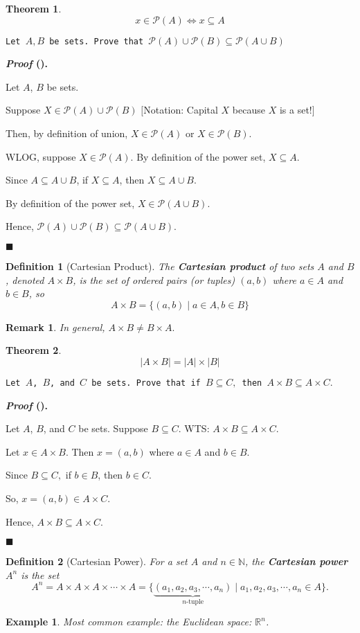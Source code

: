 \documentclass[12pt,a4paper]{article}
\newtheorem{thm}{Theorem}[subsection]
\newtheorem{df}{Definition}[subsection]
\newtheorem{eg}{Example}[subsection]
\newcounter{nprf}[subsection]
\newtheorem*{rmk}{\indent Remark}
\newenvironment*{prf}{\par\indent\textbf{\textit{Proof} (\stepcounter{nprf}\thenprf). }\par }{\par\hfill $\blacksquare$\par}
\def\R{{\mathbb{R}}}
\def\N{{\mathbb{N}}}
\def\pow{{\mathcal{P}}}
\begin{document}
\begin{thm}
	\[x\in\pow(A)\iff x\subseteq A\]	
\end{thm}
\begin{framed}
\noindent\texttt{Let $A, B$ be sets. Prove that $\pow(A)\cup\pow(B)\subseteq\pow(A\cup B)$}
\begin{prf}
	Let $A$, $B$ be sets.\par Suppose $X\in\pow(A)\cup\pow(B)$ $\big[$Notation: Capital $X$ because $X$ is a set!$\big]$\par Then, by definition of union, $X\in\pow(A)$ or $X\in\pow(B).$\par WLOG, suppose $X\in\pow(A).$ By definition of the power set, $X\subseteq A$.\par Since $A\subseteq A\cup B$, if $X\subseteq A$, then $X\subseteq A\cup B$.\par By definition of the power set, $X\in\pow(A\cup B).$\par Hence, $\pow(A)\cup\pow(B)\subseteq\pow(A\cup B).$
\end{prf}
\end{framed}
\begin{df}[Cartesian Product]
	The \textbf{Cartesian product} of two sets $A$ and $B$, denoted $A\times B$, is the set of ordered pairs (or tuples) $(a,b)$ where $a\in A$ and $b\in B$, so \[A\times B=\{(a,b)\mid a\in A, b\in B\}\]
\end{df}
\begin{rmk} In general, $A\times B\neq B\times A.$\end{rmk}
\begin{thm}
	\[|A\times B|=|A|\times|B|\]	
\end{thm}
\begin{framed}
\noindent\texttt{Let $A$, $B$, and $C$ be sets. Prove that if $B\subseteq C,$ then $A\times B\subseteq A\times C.$}
\begin{prf}
	Let $A$, $B$, and $C$ be sets. Suppose $B\subseteq C$. WTS: $A\times B\subseteq A\times C.$\par Let $x\in A\times B$. Then $x=(a,b)$ where $a\in A$ and $b\in B.$\par Since $B\subseteq C,$ if $b\in B$, then $b\in C.$\par So, $x=(a,b)\in A\times C.$\par Hence, $A\times B\subseteq A\times C.$	
\end{prf}
\end{framed}
\begin{df}[Cartesian Power]
	For a set $A$ and $n\in\N$, the \textbf{Cartesian power} $A^n$ is the set \[A^n=A\times A\times A\times\cdots\times A=\{\underbrace{(a_1,a_2,a_3,\cdots,a_n)}_{n\text{-tuple}}\mid a_1,a_2,a_3,\cdots,a_n\in A\}.\]	
\end{df}
\begin{eg}
	Most common example: the Euclidean space: $\R^n$.	
\end{eg}
\end{document}
